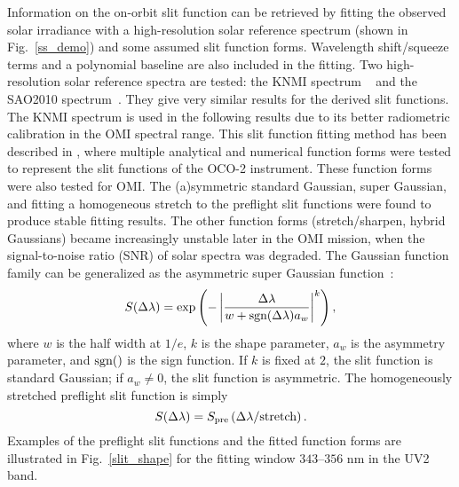\documentclass[amt,manuscript]{copernicus}
\begin{document}
Information on the on-orbit slit function can be retrieved by fitting the observed solar irradiance with a high-resolution solar reference spectrum (shown in Fig.~\ref{ss_demo}) and some assumed slit function forms. Wavelength shift/squeeze terms and a polynomial baseline are also included in the fitting. Two high-resolution solar reference spectra are tested: the KNMI spectrum ~\citep[$0.025$ nm resolution and $0.01$ nm sampling,][]{dobber2008high} and the SAO2010 spectrum~\citep[$0.04$ nm resolution and $0.01$ nm sampling,][]{chance2010improved}. They give very similar results for the derived slit functions. The KNMI spectrum is used in the following results due to its better radiometric calibration in the OMI spectral range. This slit function fitting method has been described in \citet{sun2017}, where multiple analytical and numerical function forms were tested to represent the slit functions of the OCO-2 instrument. These function forms were also tested for OMI. The (a)symmetric standard Gaussian, super Gaussian, and fitting a homogeneous stretch to the preflight slit functions were found to produce stable fitting results. The other function forms (stretch/sharpen, hybrid Gaussians) became increasingly unstable later in the OMI mission, when the signal-to-noise ratio (SNR) of solar spectra was degraded. The Gaussian function family can be generalized as the asymmetric super Gaussian function~\citep{Beirle2016parameterizing}:
\begin{equation}
S(\Delta \lambda) = \exp \left(-\left|\frac{\Delta\lambda}{w+\textnormal{sgn}(\Delta \lambda)a_w}\right|^k \right),
\end{equation}
where $w$ is the half width at $1/e$, $k$ is the shape parameter, $a_w$ is the asymmetry parameter, and $\textnormal{sgn}()$ is the sign function. If $k$ is fixed at $2$, the slit function is standard Gaussian; if $a_w \neq 0$, the slit function is asymmetric. The homogeneously stretched preflight slit function is simply
\begin{equation}
S(\Delta \lambda) = S_{\textnormal{pre}}\left( {\Delta \lambda}/{\textnormal{stretch}} \right).
\end{equation}
Examples of the preflight slit functions and the fitted function forms are illustrated in Fig.~\ref{slit_shape} for the fitting window $343$--$356$ nm in the UV2 band.
\end{document}
